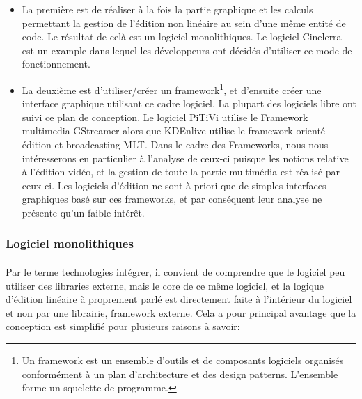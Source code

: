 \begin{itemize}
  \item{La première est de réaliser à la fois la partie graphique et
    les calculs permettant la gestion de l'édition non linéaire au
    sein d'une même entité de code. Le résultat de celà est un logiciel
    monolithiques. Le logiciel Cinelerra est un %
    example dans lequel les développeurs ont décidés d'utiliser ce
    mode de fonctionnement.}
  \item{La deuxième est d'utiliser/créer un framework\footnote{Un
    framework est un ensemble d'outils et de composants logiciels
    organisés conformément à un plan d'architecture et des design
    patterns. L'ensemble forme un squelette de programme.}, et d'ensuite
    créer une interface graphique utilisant ce cadre logiciel. La
    plupart des logiciels libre ont suivi ce plan de conception. Le
    logiciel PiTiVi utilise le Framework multimedia GStreamer alors que
    KDEnlive utilise le framework orienté édition et broadcasting
    MLT. Dans le cadre des Frameworks, nous nous intéresserons en
    particulier à l'analyse de ceux-ci puisque les notions relative à
    l'édition vidéo, et la gestion de toute la partie multimédia est
    réalisé par ceux-ci. Les logiciels d'édition ne sont à priori
    que de simples interfaces graphiques basé sur ces frameworks,
    et par conséquent leur analyse ne présente qu'un faible intérêt.}
\end{itemize}

\subsubsection{Logiciel monolithiques} %

\paragraph{} Par le terme technologies intégrer, il convient de
comprendre que le logiciel peu utiliser des libraries externe, mais
le core de ce même logiciel, et la logique d'édition linéaire à
proprement parlé est directement faite à l'intérieur du logiciel et
non par une librairie, framework externe. Cela a pour principal avantage
que la conception est simplifié pour plusieurs raisons à savoir:

